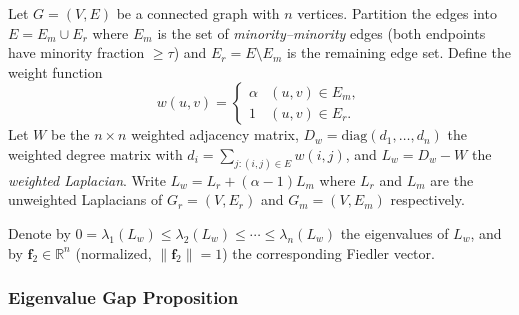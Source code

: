 Let $G = (V, E)$ be a connected graph with $n$ vertices. Partition the edges into $E = E_m \cup E_r$ where $E_m$ is the set of \emph{minority--minority} edges (both endpoints have minority fraction $\geq \tau$) and $E_r = E \setminus E_m$ is the remaining edge set. Define the weight function
\[
    w(u,v) = \begin{cases} \alpha & (u,v) \in E_m, \\ 1 & (u,v) \in E_r. \end{cases}
\]
Let $W$ be the $n\times n$ weighted adjacency matrix, $D_w = \mathrm{diag}(d_1,\ldots,d_n)$ the weighted degree matrix with $d_i = \sum_{j:(i,j)\in E} w(i,j)$, and $L_w = D_w - W$ the \emph{weighted Laplacian}. Write $L_w = L_r + (\alpha-1) L_m$ where $L_r$ and $L_m$ are the unweighted Laplacians of $G_r = (V,E_r)$ and $G_m = (V,E_m)$ respectively.

Denote by $0 = \lambda_1(L_w) \leq \lambda_2(L_w) \leq \cdots \leq \lambda_n(L_w)$ the eigenvalues of $L_w$, and by $\mathbf{f}_2 \in \mathbb{R}^n$ (normalized, $\|\mathbf{f}_2\|=1$) the corresponding Fiedler vector.

\subsubsection{Eigenvalue Gap Proposition}

